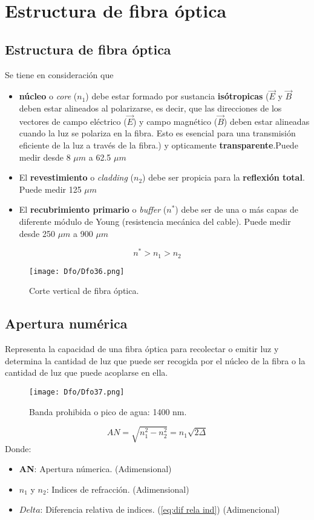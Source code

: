 \documentclass[
	12pt, %
	fleqn, %
	a4paper, %
	oneside, %
]{LegrandOrangeBook}
\begin{document}
\chapter{Estructura de fibra óptica}
\section{Estructura de fibra óptica}
Se tiene en consideración que
\begin{itemize}
\item \textbf{núcleo} o \textit{core} ($n_1$) debe estar formado por sustancia \textbf{isótropicas} ($\vec{E}$ y $\vec{B}$ deben estar alineados al polarizarse, es decir, que las direcciones de los vectores de campo eléctrico ($\vec{E}$) y campo magnético ($\vec{B}$) deben estar alineadas cuando la luz se polariza en la fibra. Esto es esencial para una transmisión eficiente de la luz a través de la fibra.) y opticamente \textbf{transparente}.Puede medir desde 8 $\mu m$ a 62.5 $\mu m$

\item El \textbf{revestimiento} o \textit{cladding} ($n_2$) debe ser propicia para la \textbf{reflexión total}. Puede medir 125 $\mu m$
\item El \textbf{recubrimiento primario} o \textit{buffer} ($n^*$) debe ser de una o más capas de diferente módulo de Young (resistencia mecánica del cable). Puede medir desde 250 $\mu m$ a 900 $\mu m$
\end{itemize}
\begin{displaymath}
n^*>n_1>n_2
\end{displaymath}
\begin{figure}[H]
\centering
\texttt{[image: Dfo/Dfo36.png]}
\caption{Corte vertical de fibra óptica.}
\end{figure}
\section{Apertura numérica}
Representa la capacidad de una fibra óptica para recolectar o emitir luz y determina la cantidad de luz que puede ser recogida por el núcleo de la fibra o la cantidad de luz que puede acoplarse en ella.
\begin{figure}[H]
\centering
\texttt{[image: Dfo/Dfo37.png]}
\caption{Banda prohibida o pico de agua: 1400 nm.}
\end{figure}
\begin{equation}
AN=\sqrt{n_1^2-n_2^2}=n_1\sqrt{2\Delta}
\end{equation}
Donde:
\begin{itemize}
\item \textbf{AN}: Apertura númerica. (Adimensional)
\item $n_1$ y $n_2$: Indices de refracción. (Adimensional)
\item $Delta$: Diferencia relativa de indices. (\ref{eq:dif rela ind}) (Adimencional)
\end{itemize}
\end{document}
